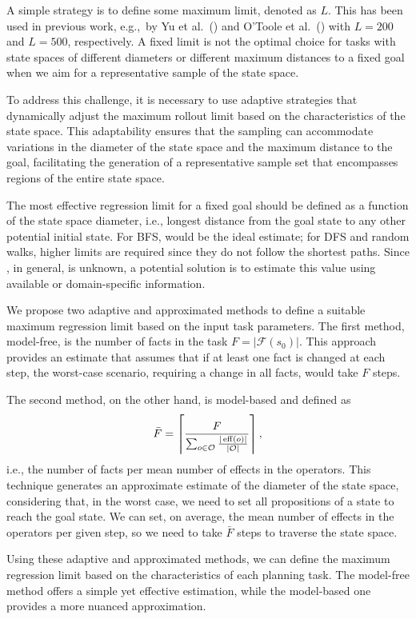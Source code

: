 A simple strategy is to define some maximum limit, denoted as $L$. This has been used in previous work, e.g.,~by Yu et al.~(\citeyear{Yu.etal/2020}) and O'Toole et al.~(\citeyear{OToole/2022}) with $L=200$ and $L=500$, respectively. A fixed limit is not the optimal choice for tasks with state spaces of different diameters or different maximum distances to a fixed goal when we aim for a representative sample of the state space.

To address this challenge, it is necessary to use adaptive strategies that dynamically adjust the maximum rollout limit based on the characteristics of the state space. This adaptability ensures that the sampling can accommodate variations in the diameter of the state space and the maximum distance to the goal, facilitating the generation of a representative sample set that encompasses regions of the entire state space.

The most effective regression limit for a fixed goal should be defined as a function of the state space diameter, i.e., longest distance \distfarthest from the goal state to any other potential initial state. For BFS, \distfarthest would be the ideal estimate; for DFS and random walks, higher limits are required since they do not follow the shortest paths.
Since \distfarthest, in general, is unknown, a potential solution is to estimate this value using available or domain-specific information.

We propose two adaptive and approximated methods to define a suitable maximum regression limit based on the input task parameters. The first method, model-free, is the number of facts in the task $F=|\mathcal{F}(s_0)|$. This approach provides an estimate that assumes that if at least one fact is changed at each step, the worst-case scenario, requiring a change in all facts, would take $F$ steps.

The second method, on the other hand, is model-based and defined as $$\bar F=\left\lceil \frac{F}{\sum_{o\in \mathcal{O}} \frac{|\operatorname{eff}(o)|}{|\mathcal{O}|}}\right\rceil,$$ i.e., the number of facts per mean number of effects in the operators. This technique generates an approximate estimate of the diameter of the state space, considering that, in the worst case, we need to set all propositions of a state to reach the goal state. We can set, on average, the mean number of effects in the operators per given step, so we need to take $\bar F$ steps to traverse the state space.

Using these adaptive and approximated methods, we can define the maximum regression limit based on the characteristics of each planning task. The model-free method offers a simple yet effective estimation, while the model-based one provides a more nuanced approximation.

